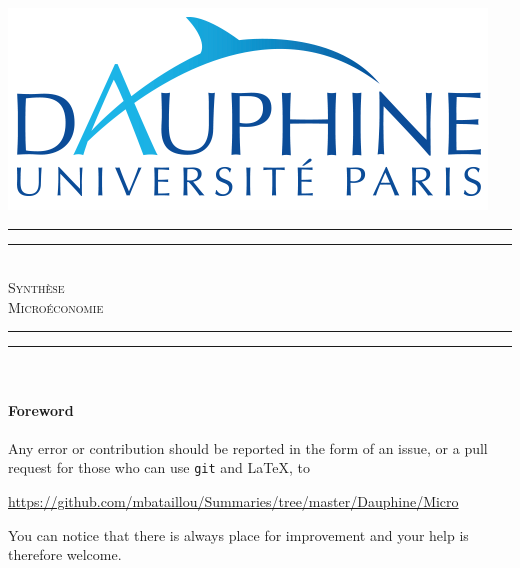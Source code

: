 \begin{titlepage}
\begin{center}


\includegraphics[scale=0.5]{./img/dauphine_logo} \\[1.5cm]



\vfill
\rule{\textwidth}{1.6pt}\vspace*{-\baselineskip}\vspace*{2pt} %
\rule{\textwidth}{0.4pt}\\[\baselineskip] %
{ \huge  \textsc{Synthèse} \\[0.4cm]
\textsc{Microéconomie} }
\rule{\textwidth}{0.4pt}\vspace*{-\baselineskip}\vspace{3.2pt} %
\rule{\textwidth}{1.6pt}\\[1.5cm] %

\vfill
\paragraph{Foreword}
Any error or contribution should be reported
in the form of an issue, or a pull request for those
who can use \texttt{git} and \LaTeX, to
\begin{center}
  \url{https://github.com/mbataillou/Summaries/tree/master/Dauphine/Micro}
\end{center}
You can notice that there is always place for improvement
and your help is therefore welcome.
\vspace{\baselineskip}


\end{center}
\end{titlepage}
